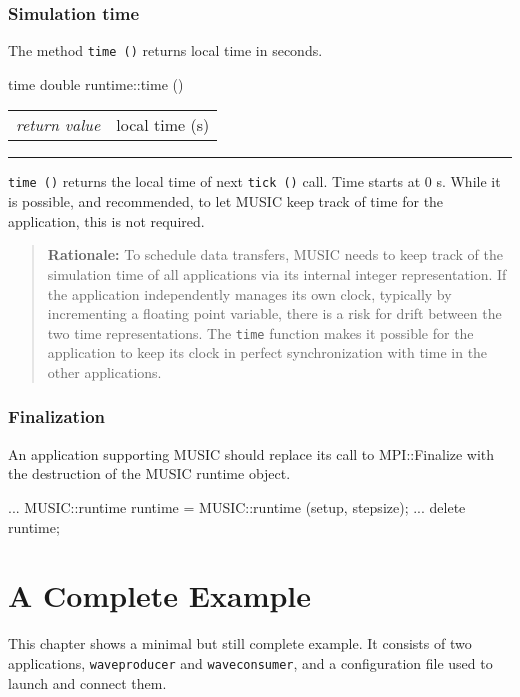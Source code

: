 \documentclass[a4paper]{report}
\makeatletter
\newenvironment{rationale}%
{\par\begin{quote}\textbf{Rationale:}}%
{\par\end{quote}}
\newenvironment{parameters}%
{\begin{tabular}{@{\hspace{2em}}lp{0.6\textwidth}}}%
{\end{tabular}\par\vspace{1mm}\par\hrule\par\vspace{5mm}}
\makeatother
\begin{document}
\subsection{Simulation time}

The method \lstinline|time ()| returns local time in seconds.

\begin{head}{time}
  double runtime::time ()
\end{head}
\begin{parameters}
  \emph{return value} & local time (s) \\
\end{parameters}

\lstinline|time ()| returns the local time of next \lstinline|tick ()|
call.  Time starts at 0 s.  While it is possible, and recommended, to
let MUSIC keep track of time for the application, this is not
required.

\begin{rationale}
  To schedule data transfers, MUSIC needs to keep track of the
  simulation time of all applications via its internal integer
  representation.  If the application independently manages its own
  clock, typically by incrementing a floating point variable, there is
  a risk for drift between the two time representations.  The
  \lstinline|time| function makes it possible for the application to
  keep its clock in perfect synchronization with time in the other
  applications.
\end{rationale}


\subsection{Finalization}

An application supporting MUSIC should replace its call to
MPI::Finalize with the destruction of the MUSIC runtime object.

\begin{code}{}
  ...
  MUSIC::runtime runtime = MUSIC::runtime (setup, stepsize);
  ...
  delete runtime;
\end{code}

\chapter{A Complete Example}

This chapter shows a minimal but still complete example.  It consists
of two applications, \texttt{waveproducer} and \texttt{waveconsumer},
and a configuration file used to launch and connect them.
\end{document}
